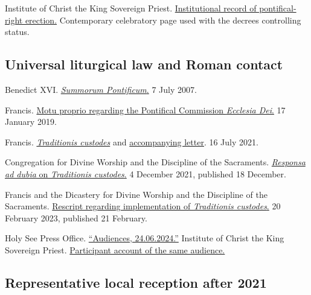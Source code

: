 Institute of Christ the King Sovereign Priest. \href{https://www.icrsp.org/Droit-Pontifical/Droit-Pontifical.htm}{Institutional record of pontifical-right erection.} Contemporary celebratory page used with the decrees controlling status.

\subsection{Universal liturgical law and Roman contact}

Benedict XVI. \href{https://www.vatican.va/content/benedict-xvi/en/motu_proprio/documents/hf_ben-xvi_motu-proprio_20070707_summorum-pontificum.html}{\emph{Summorum Pontificum}.} 7 July 2007.

Francis. \href{https://www.vatican.va/content/francesco/en/motu_proprio/documents/papa-francesco-motu-proprio-20190117_ecclesia-dei.html}{Motu proprio regarding the Pontifical Commission \emph{Ecclesia Dei}.} 17 January 2019.

Francis. \href{https://www.vatican.va/content/francesco/en/motu_proprio/documents/20210716-motu-proprio-traditionis-custodes.html}{\emph{Traditionis custodes}} and \href{https://www.vatican.va/content/francesco/en/letters/2021/documents/20210716-lettera-vescovi-liturgia.html}{accompanying letter}. 16 July 2021.

Congregation for Divine Worship and the Discipline of the Sacraments. \href{https://www.vatican.va/roman_curia/congregations/ccdds/documents/rc_con_ccdds_doc_20211204_responsa-ad-dubia-tradizionis-custodes_en.html}{\emph{Responsa ad dubia} on \emph{Traditionis custodes}.} 4 December 2021, published 18 December.

Francis and the Dicastery for Divine Worship and the Discipline of the Sacraments. \href{https://press.vatican.va/roman_curia/congregations/ccdds/documents/rc_con_ccdds_doc_20230220_rescriptum-traditioniscustodes_en.html}{Rescript regarding implementation of \emph{Traditionis custodes}.} 20 February 2023, published 21 February.

Holy See Press Office. \href{https://press.vatican.va/content/salastampa/en/bollettino/pubblico/2024/06/24/240624b.html}{``Audiences, 24.06.2024.''} Institute of Christ the King Sovereign Priest. \href{https://www.icrsp.org/News/Audience-Papale-2024/audience-papale-2024.htm}{Participant account of the same audience.}

\subsection{Representative local reception after 2021}

